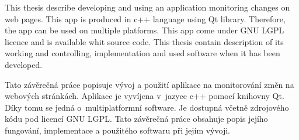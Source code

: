 


\def\obrazek#1#2#3{
	\begin{figure}[tbhp]
  \centering
	{#1}
	\caption{{#2}}
  \label{fig:#3}
\end{figure}
	}
\def\obr#1#2{\obrazek{\texttt{[image: screenshots/\#1.png]}}{#2}{#1}}
\def\obrsize#1#2#3{\obrazek{\texttt{[image: screenshots/\#1.png]}}{#2}{#1}}
\def\,{\penalty10000\hskip.25em}
\pagestyle{headings}

\bakalarska





{This thesis describe developing and using an application monitoring changes on web pages.
This app is produced in c++ language using Qt library. Therefore, the app can be used on multiple platforms.
This app come under GNU LGPL licence and is available whit source code. This thesis contain description of its working and controlling, implementation and used software when it has been developed.}

{Tato závěrečná práce popisuje vývoj a použití aplikace na monitorování změn na webových stránkách.
Aplikace je vyvíjena v~jazyce c++ pomocí knihovny Qt. Díky tomu se jedná o~multiplatformní software.
Je dostupná včetně zdrojového kódu pod licencí GNU LGPL. Tato závěrečná práce obsahuje popis jejího fungování, implementace a použitého softwaru při jejím vývoji.}

\obsah

















